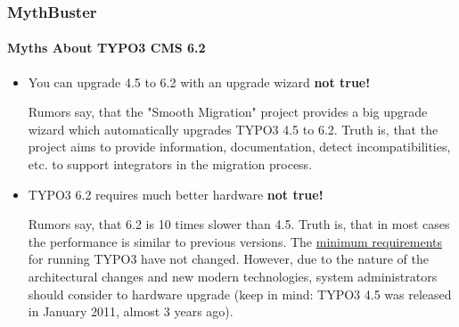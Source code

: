 \begin{frame}[fragile]
	\frametitle{MythBuster}
	\framesubtitle{Myths About TYPO3 CMS 6.2}

	\begin{itemize}
		\item You can upgrade 4.5 to 6.2 with an upgrade wizard
			\tabto{9cm}\color{red}\textbf{\textrightarrow not true!}\color{black}

			\smaller
				Rumors say, that the "Smooth Migration" project provides a big upgrade wizard which automatically upgrades TYPO3 4.5 to 6.2. Truth is, that the project aims to provide information, documentation, detect incompatibilities, etc. to support integrators in the migration process.
			\normalsize

		\item TYPO3 6.2 requires much better hardware
			\tabto{9cm}\color{red}\textbf{\textrightarrow not true!}\color{black}

			\smaller
				Rumors say, that 6.2 is 10 times slower than 4.5. Truth is, that in most cases the performance is similar to previous versions. The \href{http://typo3.org/about/typo3-the-cms/system-requirements/}{minimum requirements} for running TYPO3 have not changed. However, due to the nature of the architectural changes and new modern technologies, system administrators should consider to hardware upgrade (keep in mind: TYPO3 4.5 was released in January 2011, almost 3 years ago).
			\normalsize

	\end{itemize}

\end{frame}


